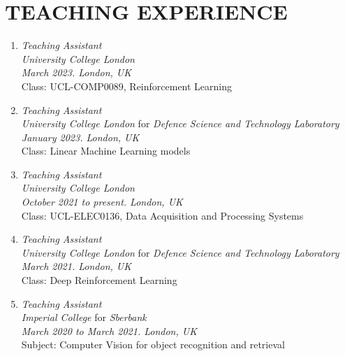 \section*{TEACHING EXPERIENCE}
\begin{enumerate}[leftmargin=0.45cm, itemsep=0.4em, topsep=0.5em, parsep=0.2em]
    \item
    \emph{Teaching Assistant} \\
    \emph{University College London} \\
    \textit{March 2023. London, UK} \\
    Class: UCL-COMP0089, Reinforcement Learning

    \item
    \emph{Teaching Assistant} \\
    \emph{University College London} for \emph{Defence Science and Technology Laboratory} \\
    \textit{January 2023. London, UK} \\
    Class: Linear Machine Learning models

    \item
    \emph{Teaching Assistant} \\
    \emph{University College London} \\
    \textit{October 2021 to \emph{present}. London, UK}  \\
    Class: UCL-ELEC0136, Data Acquisition and Processing Systems

    \item
    \emph{Teaching Assistant} \\
    \emph{University College London} for \emph{Defence Science and Technology Laboratory} \\
    \textit{March 2021. London, UK} \\
    Class: Deep Reinforcement Learning

    \item
    \emph{Teaching Assistant} \\
    \emph{Imperial College} for \emph{Sberbank} \\
    \textit{March 2020 to March 2021. London, UK} \\
    Subject: Computer Vision for object recognition and retrieval


\end{enumerate}
